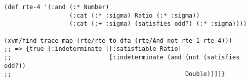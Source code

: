 \begin{lstlisting}[style=reclojureClojure,frame=single]
(def rte-4 '(:and (:* Number)
                  (:cat (:* :sigma) Ratio (:* :sigma))
                  (:cat (:+ :sigma) (satisfies odd?) (:* :sigma))))

(xym/find-trace-map (rte/rte-to-dfa (rte/And-not rte-1 rte-4)))
;; => {true [:indeterminate [[:satisfiable Ratio]
;;                           [:indeterminate (and (not (satisfies odd?))
;;                                                Double)]]]}  
\end{lstlisting}
